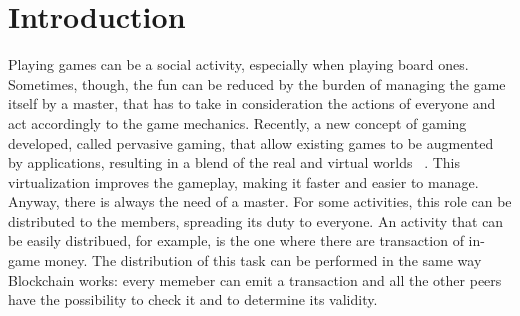 \section{Introduction}

Playing games can be a social activity, especially when playing board ones. 
Sometimes, though, the fun can be reduced by the burden of managing the 
game itself by a master, that has to take in consideration the actions of 
everyone and act accordingly to the game mechanics. Recently, a new  concept of 
gaming developed, called pervasive gaming, that allow existing games to be 
augmented by applications, resulting in a blend of the real and virtual worlds 
~\cite{arango17}.
This virtualization improves the gameplay, making it faster and easier to 
manage. Anyway, there is always the need of a master. For some activities, this 
role can be distributed to the members, spreading its duty to everyone. An 
activity that can be easily distribued, for example, is the one where there are 
transaction of in-game money. The distribution of this task can be performed in 
the same way Blockchain works: every memeber can emit a transaction and all the 
other peers have the possibility to check it and to determine its validity.